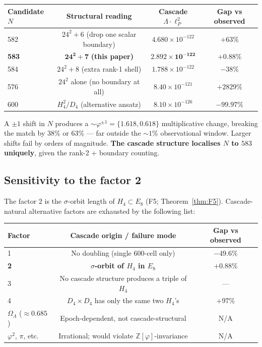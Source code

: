 \documentclass[11pt]{article}
\theoremstyle{plain}
\theoremstyle{definition}
\theoremstyle{remark}
\newcommand{\Zphi}{\mathbb{Z}[\varphi]}
\begin{document}
\begin{center}
\begin{tabular}{lccc}
\toprule
Candidate $N$ & Structural reading & Cascade $\Lambda \cdot \ell_P^2$ & Gap vs observed \\
\midrule
582 & $24^2 + 6$ (drop one scalar boundary) & $4.680 \times 10^{-122}$ & $+63\%$ \\
\textbf{583} & $\mathbf{24^2 + 7}$ \textbf{(this paper)} & $\mathbf{2.892 \times 10^{-122}}$ & $\mathbf{+0.88\%}$ \\
584 & $24^2 + 8$ (extra rank-1 shell) & $1.788 \times 10^{-122}$ & $-38\%$ \\
576 & $24^2$ alone (no boundary at all) & $8.40 \times 10^{-121}$ & $+2829\%$ \\
600 & $H_4^2 / D_4$ (alternative ansatz) & $8.10 \times 10^{-126}$ & $-99.97\%$ \\
\bottomrule
\end{tabular}
\end{center}

A $\pm 1$ shift in $N$ produces a $\sim \varphi^{\pm 1} = \{1.618, 0.618\}$ multiplicative change, breaking the match by $38\%$ or $63\%$ --- far outside the $\sim 1\%$ observational window. Larger shifts fail by orders of magnitude. \textbf{The cascade structure localises $N$ to $583$ uniquely}, given the rank-2 + boundary counting.

\subsection{Sensitivity to the factor 2}

The factor 2 is the $\sigma$-orbit length of $H_4 \subset E_8$ (F5; Theorem~\ref{thm:F5}). Cascade-natural alternative factors are exhausted by the following list:

\begin{center}
\begin{tabular}{lcc}
\toprule
Factor & Cascade origin / failure mode & Gap vs observed \\
\midrule
1 & No doubling (single 600-cell only) & $-49.6\%$ \\
\textbf{2} & \textbf{$\sigma$-orbit of $H_4$ in $E_8$} & \textbf{$+0.88\%$} \\
3 & No cascade structure produces a triple of $H_4$ & --- \\
4 & $D_4 \times D_4$ has only the same two $H_4$'s & $+97\%$ \\
$\Omega_\Lambda$ ($\approx 0.685$) & Epoch-dependent, not cascade-structural & N/A \\
$\varphi^2$, $\pi$, etc. & Irrational; would violate $\Zphi$-invariance & N/A \\
\bottomrule
\end{tabular}
\end{center}
\end{document}
